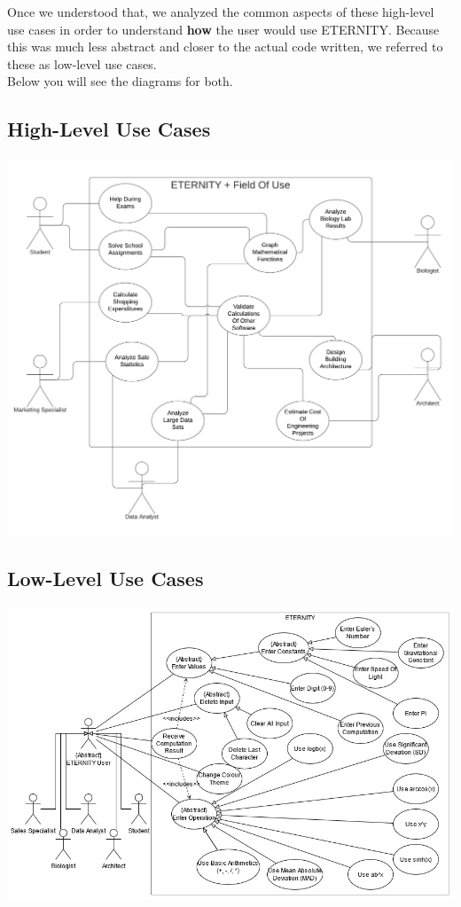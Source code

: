 \documentclass[11pt,onside]{report}
\begin{document}
Once we understood that, we analyzed the common aspects of these high-level use cases in order to understand \textbf{how} the user would use ETERNITY. Because this was much less abstract and closer to the actual code written, we referred to these as low-level use cases. \\

Below you will see the diagrams for both.

\subsection{High-Level Use Cases}
\begin{center}
    \includegraphics[scale=0.66]{images/high-level-use-case.png}
\end{center}

\subsection{Low-Level Use Cases}
\begin{center}
    \includegraphics[scale=0.5]{images/Low-Level-Use-Cases.jpg}
\end{center}
\end{document}
